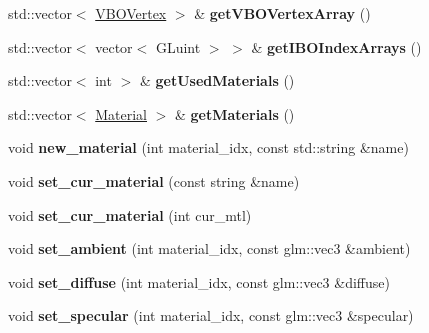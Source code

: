 \begin{DoxyCompactItemize}
\item 
\hypertarget{classMesh_abbfb42b55e8cfaf340d344af708f435e}{std\-::vector$<$ \hyperlink{structVBOVertex}{V\-B\-O\-Vertex} $>$ \& {\bfseries get\-V\-B\-O\-Vertex\-Array} ()}\label{classMesh_abbfb42b55e8cfaf340d344af708f435e}

\item 
\hypertarget{classMesh_ac6a5c0633ed0acfdc76659bce170b53e}{std\-::vector$<$ vector$<$ G\-Luint $>$ $>$ \& {\bfseries get\-I\-B\-O\-Index\-Arrays} ()}\label{classMesh_ac6a5c0633ed0acfdc76659bce170b53e}

\item 
\hypertarget{classMesh_a63bea725717d1eed08a5b36fae1edc3f}{std\-::vector$<$ int $>$ \& {\bfseries get\-Used\-Materials} ()}\label{classMesh_a63bea725717d1eed08a5b36fae1edc3f}

\item 
\hypertarget{classMesh_aef73d7d063129475d060d26d309e6432}{std\-::vector$<$ \hyperlink{classMaterial}{Material} $>$ \& {\bfseries get\-Materials} ()}\label{classMesh_aef73d7d063129475d060d26d309e6432}

\item 
\hypertarget{classMesh_a7a961353b6282350124d154fb6954d98}{void {\bfseries new\-\_\-material} (int material\-\_\-idx, const std\-::string \&name)}\label{classMesh_a7a961353b6282350124d154fb6954d98}

\item 
\hypertarget{classMesh_a824f5eb1ae2410e8ca0aa5545d1fc8a7}{void {\bfseries set\-\_\-cur\-\_\-material} (const string \&name)}\label{classMesh_a824f5eb1ae2410e8ca0aa5545d1fc8a7}

\item 
\hypertarget{classMesh_a50427b613dfc9d2bbfad3606cdebb793}{void {\bfseries set\-\_\-cur\-\_\-material} (int cur\-\_\-mtl)}\label{classMesh_a50427b613dfc9d2bbfad3606cdebb793}

\item 
\hypertarget{classMesh_a067a5fa985f9cd9a04e4c1fa5a6da8d9}{void {\bfseries set\-\_\-ambient} (int material\-\_\-idx, const glm\-::vec3 \&ambient)}\label{classMesh_a067a5fa985f9cd9a04e4c1fa5a6da8d9}

\item 
\hypertarget{classMesh_af76944b10f0964e2aa5092eda8c00675}{void {\bfseries set\-\_\-diffuse} (int material\-\_\-idx, const glm\-::vec3 \&diffuse)}\label{classMesh_af76944b10f0964e2aa5092eda8c00675}

\item 
\hypertarget{classMesh_af0ff9ddf30edddf1f563ca9d92555b47}{void {\bfseries set\-\_\-specular} (int material\-\_\-idx, const glm\-::vec3 \&specular)}\label{classMesh_af0ff9ddf30edddf1f563ca9d92555b47}


\end{DoxyCompactItemize}
